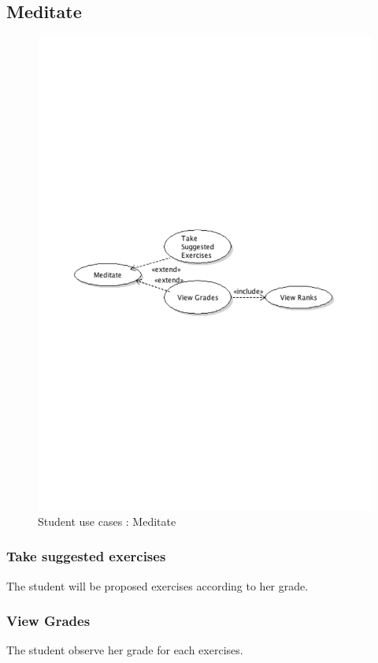 	\subsection{Meditate}
		\begin{figure}[ht]
			\begin{center}
				\includegraphics[width=\textwidth,  trim=2cm 12cm 2cm 12cm]{UML_figure/UC/student/UC_Student_Meditate.pdf}
				\caption{Student use cases : Meditate}
			\end{center}
		\end{figure}
		\subsubsection{Take suggested exercises}
			The student will be proposed exercises according to her grade.
		\subsubsection{View Grades}
			The student observe her grade for each exercises.
